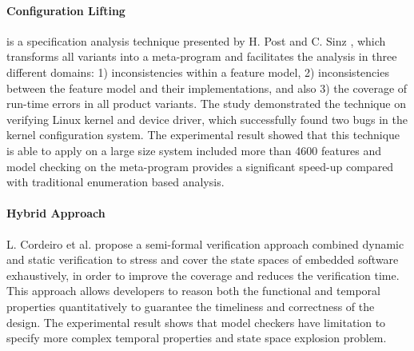 

\paragraph{Configuration Lifting} is a specification analysis technique presented by
H. Post and C. Sinz \cite{4639338}, which transforms all variants into a meta-program and facilitates the analysis in three different domains: 1) inconsistencies within a feature model, 2) inconsistencies between the feature model and their implementations, and also 3) the coverage of run-time errors in all product variants. The study demonstrated the technique on verifying Linux kernel and device driver, which successfully found two bugs in the kernel configuration system. The experimental result showed that this technique is able to apply on a large size system included more than 4600 features and model checking on the meta-program provides a significant speed-up compared with traditional enumeration based analysis.

\paragraph{Hybrid Approach} L. Cordeiro et al. \cite{5066674} propose a semi-formal verification approach combined dynamic and static verification to stress and cover the state spaces of embedded software exhaustively, in order to improve the coverage and reduces the verification time. This approach allows developers to reason both the functional and temporal properties quantitatively to guarantee the timeliness and correctness of the design. The experimental result shows that model checkers have  limitation to specify more complex temporal properties and state space explosion problem.


